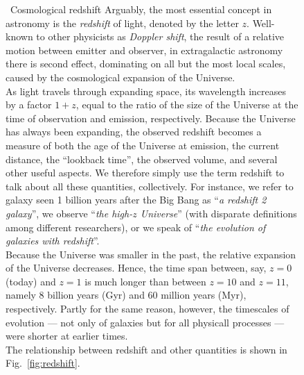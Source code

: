 \documentclass[useAMS,usenatbib,bibyear]{aa}
\begin{document}
\begin{figure}[!t]
\begin{bclogo}[
    couleur=gray!20,
    epBord=1,
    arrondi=0.1,
    logo=\bcinfo,
    marge=8,
    ombre=false, %
    couleurBord=gray!60,
    barre=line]
    { \ \textsf{Cosmological redshift}}
    \small{\textsf{Arguably, the most essential concept in astronomy is the \emph{redshift} of light, denoted by the letter $z$.
    Well-known to other physicists as \emph{Doppler shift}, the result of a relative motion between emitter and observer, in extragalactic astronomy there is second effect, dominating on all but the most local scales, caused by the cosmological expansion of the Universe.\vspace{1mm}\\
    As light travels through expanding space, its wavelength increases by a factor $1+z$, equal to the ratio of the size of the Universe at the time of observation and emission, respectively.
    Because the Universe has always been expanding, the observed redshift becomes a measure of both the age of the Universe at emission, the current distance, the ``lookback time'', the observed volume, and several other useful aspects.
    We therefore simply use the term redshift to talk about all these quantities, collectively.
    For instance, we refer to galaxy seen 1 billion years after the Big Bang as ``\emph{a redshift 2 galaxy}'', we observe ``\emph{the high-$z$ Universe}'' (with disparate definitions among different researchers), or we speak of ``\emph{the evolution of galaxies with redshift}''.\vspace{1mm}\\
        Because the Universe was smaller in the past, the relative expansion of the Universe decreases.
        Hence, the time span between, say, $z=0$ (today) and $z=1$ is much longer than between $z=10$ and $z=11$, namely 8 billion years (Gyr) and 60 million years (Myr), respectively.
        Partly for the same reason, however, the timescales of evolution --- not only of galaxies but for all physicall processes --- were shorter at earlier times.\vspace{1mm}\\
        The relationship between redshift and other quantities is shown in Fig.~\ref{fig:redshift}.
    }}
\label{info:redshift}
\end{bclogo}
     \endminipage
\end{figure}
\end{document}
